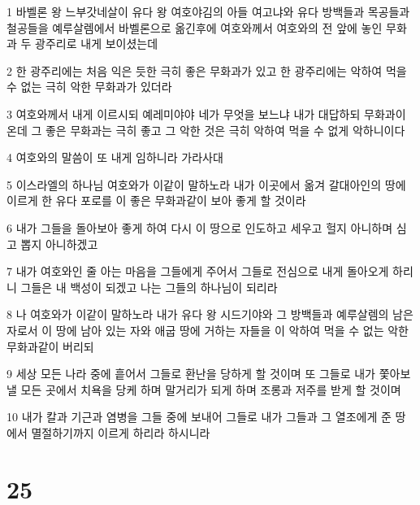 \par 1 바벨론 왕 느부갓네살이 유다 왕 여호야김의 아들 여고냐와 유다 방백들과 목공들과 철공들을 예루살렘에서 바벨론으로 옮긴후에 여호와께서 여호와의 전 앞에 놓인 무화과 두 광주리로 내게 보이셨는데
\par 2 한 광주리에는 처음 익은 듯한 극히 좋은 무화과가 있고 한 광주리에는 악하여 먹을 수 없는 극히 악한 무화과가 있더라
\par 3 여호와께서 내게 이르시되 예레미야야 네가 무엇을 보느냐 내가 대답하되 무화과이온데 그 좋은 무화과는 극히 좋고 그 악한 것은 극히 악하여 먹을 수 없게 악하니이다
\par 4 여호와의 말씀이 또 내게 임하니라 가라사대
\par 5 이스라엘의 하나님 여호와가 이같이 말하노라 내가 이곳에서 옮겨 갈대아인의 땅에 이르게 한 유다 포로를 이 좋은 무화과같이 보아 좋게 할 것이라
\par 6 내가 그들을 돌아보아 좋게 하여 다시 이 땅으로 인도하고 세우고 헐지 아니하며 심고 뽑지 아니하겠고
\par 7 내가 여호와인 줄 아는 마음을 그들에게 주어서 그들로 전심으로 내게 돌아오게 하리니 그들은 내 백성이 되겠고 나는 그들의 하나님이 되리라
\par 8 나 여호와가 이같이 말하노라 내가 유다 왕 시드기야와 그 방백들과 예루살렘의 남은 자로서 이 땅에 남아 있는 자와 애굽 땅에 거하는 자들을 이 악하여 먹을 수 없는 악한 무화과같이 버리되
\par 9 세상 모든 나라 중에 흩어서 그들로 환난을 당하게 할 것이며 또 그들로 내가 쫓아보낼 모든 곳에서 치욕을 당케 하며 말거리가 되게 하며 조롱과 저주를 받게 할 것이며
\par 10 내가 칼과 기근과 염병을 그들 중에 보내어 그들로 내가 그들과 그 열조에게 준 땅에서 멸절하기까지 이르게 하리라 하시니라

\chapter{25}

